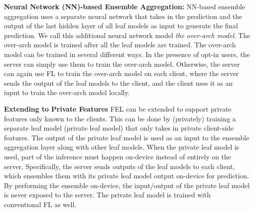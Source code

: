 \documentclass{article}
\newcommand{\il}[1]{\sethlcolor{yellow}\hl{[Ilias: #1]}}
\begin{document}
{\bf Neural Network (NN)-based Ensemble Aggregation:}
NN-based ensemble aggregation uses a separate neural network that takes in the prediction and the output of the last hidden layer of all leaf models as input to generate the final prediction.
We call this additional neural network model \textit{the over-arch model}.
The over-arch model is trained after all the leaf models are trained. The over-arch model can be trained in several different ways. In the presence of opt-in users, the server can simply use them to train the over-arch model. Otherwise, the server can again use FL to train the over-arch model on each client, where the server sends the output of the leaf models to the client, and the client uses it as an input to train the over-arch model locally.


{\bf Extending to Private Features} 
%
FEL can be extended to support private features only known to the clients. This can be done by (privately) training a separate leaf model (private leaf model) that only takes in private client-side features. The output of the private leaf model is used as an input to the ensemble aggregation layer along with other leaf models.
%
When the private leaf model is used, part of the inference must happen on-device instead of entirely on the server. Specifically, the server sends outputs of the leaf models to each client, which ensembles them with its private leaf model output on-device for prediction. By performing the ensemble on-device, the input/output of the private leaf model is never exposed to the server. The private leaf model is trained with conventional FL as well.
\end{document}
